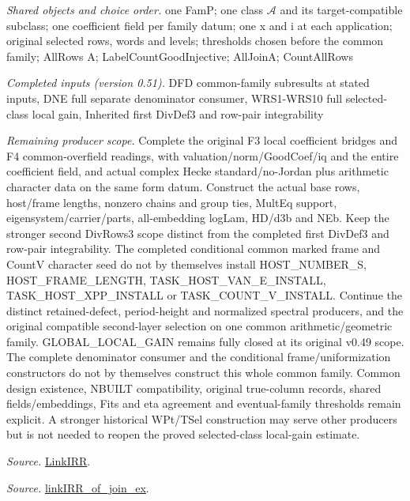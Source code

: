 \emph{Shared objects and choice order.} one FamP; one class $\mathcal A$ and its target-compatible subclass; one coefficient field per family datum; one x and i at each application; original selected rows, words and levels; thresholds chosen before the common family; AllRows A; LabelCountGoodInjective; AllJoinA; CountAllRows

\emph{Completed inputs (version 0.51).} DFD common-family subresults at stated inputs, DNE full separate denominator consumer, WRS1-WRS10 full selected-class local gain, Inherited first DivDef3 and row-pair integrability

\emph{Remaining producer scope.} Complete the original F3 local coefficient bridges and F4 common-overfield readings, with valuation/norm/GoodCoef/iq and the entire coefficient field, and actual complex Hecke standard/no-Jordan plus arithmetic character data on the same form datum. Construct the actual base rows, host/frame lengths, nonzero chains and group ties, MultEq support, eigensystem/carrier/parts, all-embedding logLam, HD/d3b and NEb. Keep the stronger second DivRows3 scope distinct from the completed first DivDef3 and row-pair integrability. The completed conditional common marked frame and CountV character seed do not by themselves install HOST\_\allowbreak NUMBER\_\allowbreak S, HOST\_\allowbreak FRAME\_\allowbreak LENGTH, TASK\_\allowbreak HOST\_\allowbreak VAN\_\allowbreak E\_\allowbreak INSTALL, TASK\_\allowbreak HOST\_\allowbreak XPP\_\allowbreak INSTALL or TASK\_\allowbreak COUNT\_\allowbreak V\_\allowbreak INSTALL. Continue the distinct retained-defect, period-height and normalized spectral producers, and the original compatible second-layer selection on one common arithmetic/geometric family. GLOBAL\_\allowbreak LOCAL\_\allowbreak GAIN remains fully closed at its original v0.49 scope. The complete denominator consumer and the conditional frame/uniformization constructors do not by themselves construct this whole common family. Common design existence, NBUILT compatibility, original true-column records, shared fields/embeddings, Fits and eta agreement and eventual-family thresholds remain explicit. A stronger historical WPt/TSel construction may serve other producers but is not needed to reopen the proved selected-class local-gain estimate.

\emph{Source.} \href{https://github.com/CocoSgt/riemann-hypothesis-lean/blob/7cbf7a0c32fca1badf05931879a37c3f8a2b03b4/src/Formalism/SharpRestriction/GlobalTheoremInputs.lean#L55-L58}{LinkIRR}.

\emph{Source.} \href{https://github.com/CocoSgt/riemann-hypothesis-lean/blob/7cbf7a0c32fca1badf05931879a37c3f8a2b03b4/src/Development/AbelianVarietyTheory/Proofs/GlobalInterpolation/LinkIRROfJoinEx.lean#L17-L38}{linkIRR\_\allowbreak of\_\allowbreak join\_\allowbreak ex}.

